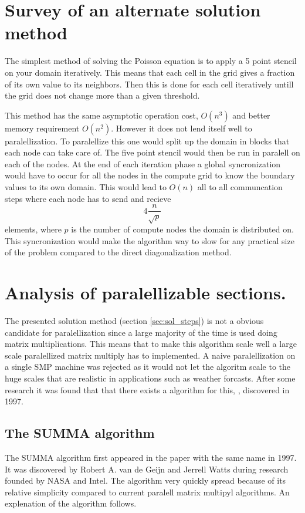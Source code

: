 \documentclass{article}
\begin{document}
\section{Survey of an alternate solution method}
The simplest method of solving the Poisson equation is to apply a 5 point stencil on your domain
iteratively. This means that each cell in the grid gives a fraction of its own value to its neighbors.
Then this is done for each cell iteratively untill the grid does not change more than a given threshold.

This method has the same asymptotic operation cost, $O(n^3)$ and better memory requirement $O(n^2)$.
However it does not lend itself well to paralellization. To paralellize this one would split
up the domain in blocks that each node can take care of. The five point stencil would then be
run in paralell on each of the nodes. At the end of each iteration phase a global
syncronization would have to occur for all the nodes in the compute grid to know the boundary values
to its own domain. This would lead to $O(n)$ all to all communcation steps where each node has to
send and recieve
\[
4\frac{n}{\sqrt{p}}
\]
elements, where $p$ is the number of compute nodes the domain is distributed on.
This syncronization would make the algorithm way to slow for any practical size
of the problem compared to the direct diagonalization method.

\section{Analysis of paralellizable sections.}
The presented solution method (section \ref{sec:sol_steps}) is not a obvious candidate for paralellization
since a large majority of the time is used doing matrix multiplications.
This means that to make this algorithm scale well a large scale paralellized
matrix multiply has to implemented. A naive paralellization on a single SMP machine
was rejected as it would not let the algoritm scale to the huge scales that are realistic
in applications such as weather forcasts.
After some research it was found that that there exists a algorithm for this, \cite{summa}, discovered in 1997.

\subsection{The SUMMA algorithm}
The SUMMA algorithm first appeared in the paper\cite{summa} with the same name in 1997.
It was discovered by Robert A. van de Geijn and Jerrell Watts during research founded by
NASA and Intel. The algorithm very quickly spread because of its relative simplicity compared
to current paralell matrix multipyl algorithms. An explenation of the algorithm follows.
\end{document}
